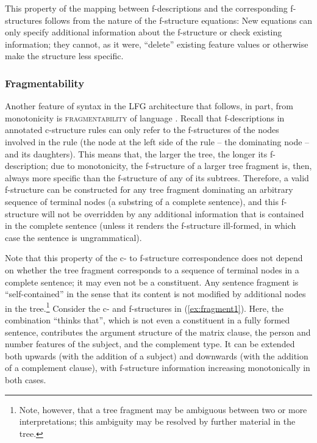 \documentclass[output=paper,hidelinks]{langscibook}
\begin{document}
This property of the mapping between f-descriptions and the corresponding f-structures follows from the nature of the f-structure equations: New equations can only specify additional information about the f-structure or check existing information; they cannot, as it were, ``delete'' existing feature values or otherwise make the structure less specific.
 
 \subsubsection{Fragmentability} Another feature of syntax in the LFG architecture that follows, in part, from monotonicity is \textsc{fragmentability} of language \citep[79--82]{BresnanEtAl2016}. Recall that f-descriptions in annotated c-structure rules can only refer to the f-structures of the nodes involved in the rule (the node at the left side of the rule -- the dominating node -- and its daughters). This means that, the larger the tree, the longer its f-description; due to monotonicity, the f-structure of a larger tree fragment is, then, always more specific than the f-structure of any of its subtrees. Therefore, a valid f-structure can be constructed for any tree fragment dominating an arbitrary sequence of terminal nodes (a substring of a complete sentence), and this f-structure will not be overridden by any additional information that is contained in the complete sentence (unless it renders the f-structure ill-formed, in which case the sentence is ungrammatical).
 
 Note that this property of the c- to f-structure correspondence does not depend on whether the tree fragment corresponds to a sequence of terminal nodes in a complete sentence; it may even not be a constituent. Any sentence fragment is ``self-contained'' in the sense that its content is not modified by additional nodes in the tree.\footnote{Note, however, that a tree fragment may be ambiguous between two or more interpretations; this ambiguity may be resolved by further material in the tree.} Consider the c- and f-structures in (\ref{ex:fragment1}). Here, the combination ``thinks that'', which is not even a constituent in a fully formed sentence, contributes the argument structure of the matrix clause, the person and number features of the subject, and the complement type. It can be extended both upwards (with the addition of a subject) and downwards (with the addition of a complement clause), with f-structure information increasing monotonically in both cases.
\end{document}
